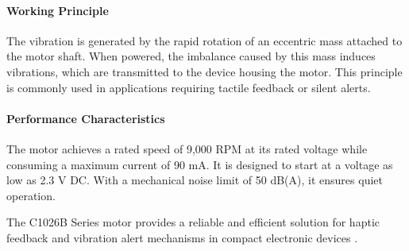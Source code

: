 \paragraph{Working Principle}
The vibration is generated by the rapid rotation of an eccentric mass attached to the motor shaft. When powered, the imbalance caused by this mass induces vibrations, which are transmitted to the device housing the motor. This principle is commonly used in applications requiring tactile feedback or silent alerts.

\paragraph{Performance Characteristics}
The motor achieves a rated speed of 9,000 RPM at its rated voltage while consuming a maximum current of 90 mA. It is designed to start at a voltage as low as 2.3 V DC. With a mechanical noise limit of 50 dB(A), it ensures quiet operation.



The C1026B Series motor provides a reliable and efficient solution for haptic feedback and vibration alert mechanisms in compact electronic devices \cite{VybronicsVC0820B006F}.
